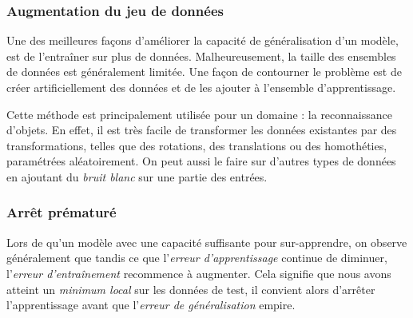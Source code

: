 \documentclass[a4paper, 10pt]{report}
\begin{document}
\subsubsection{Augmentation du jeu de données}
Une des meilleures façons d'améliorer la capacité de généralisation d'un modèle, est de l'entraîner sur plus de données.
Malheureusement, la taille des ensembles de données est généralement limitée.
Une façon de contourner le problème est de créer artificiellement des données et de les ajouter à l'ensemble d'apprentissage.

Cette méthode est principalement utilisée pour un domaine : la reconnaissance d'objets.
En effet, il est très facile de transformer les données existantes par des transformations, telles que des rotations, des translations ou des homothéties, paramétrées aléatoirement.
On peut aussi le faire sur d'autres types de données en ajoutant du \emph{bruit blanc} sur une partie des entrées.
\subsubsection{Arrêt prématuré}
Lors de qu'un modèle avec une capacité suffisante pour sur-apprendre, on observe généralement que tandis ce que l'\emph{erreur d'apprentissage} continue de diminuer, l'\emph{erreur d'entraînement} recommence à augmenter.
Cela signifie que nous avons atteint un \emph{minimum local} sur les données de test, il convient alors d'arrêter l'apprentissage avant que l'\emph{erreur de généralisation} empire.
\end{document}
